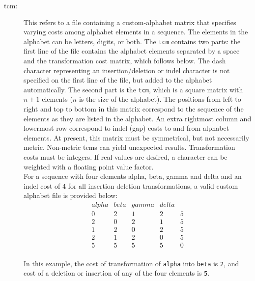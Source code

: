 \begin{description}
		\item [tcm:] This refers to a file containing a custom-alphabet matrix that specifies varying 
		costs among alphabet elements in a sequence. The elements in the alphabet can be letters, 
		digits, or both.
		The \texttt{tcm} contains two parts: the first line of the file contains the alphabet elements 
		separated by a space and the transformation cost matrix, which follows below. The dash 
		character representing an insertion/deletion or indel character is not specified on the first 
		line of the file, but added to the alphabet automatically. The second part is the \texttt{tcm}, 
		which is a square matrix with $n + 1$ elements ($n$ is the size of the alphabet). 
		The positions from left to right and top to bottom in this matrix correspond to the sequence 
		of the elements as they are listed in the alphabet. An extra rightmost column and lowermost
		row correspond to indel (gap) costs to and from alphabet elements. At present, this matrix 
		must be symmetrical, but not necessarily metric. Non-metric tcms can yield unexpected 
		results. Transformation costs must be integers. If real values are desired, a character can 
		be weighted with a floating point value factor. \\
		
		For a sequence with four elements alpha, beta, gamma and delta and an indel cost of 4 
		for all insertion deletion transformations, a valid custom alphabet file is provided below:
		\\
		\begin{equation*}
		\begin{array}{lllll}
		alpha & beta & gamma & delta &  \\
		0 &   2 &  1 &   2 &   5 \\
		2 &   0 &  2 &   1 &   5 \\
		1 &   2 &  0 &   2 &   5 \\
		2 &   1 &  2 &   0 &   5 \\
		5 &   5 &  5 &   5 &   0
		\end{array}
		\end{equation*} 
		\\
		In this example, the cost of transformation of \texttt{alpha} into \texttt{beta} is \texttt{2},
		and cost of a deletion or insertion of any of the four elements is \texttt{5}.


\end{description}
